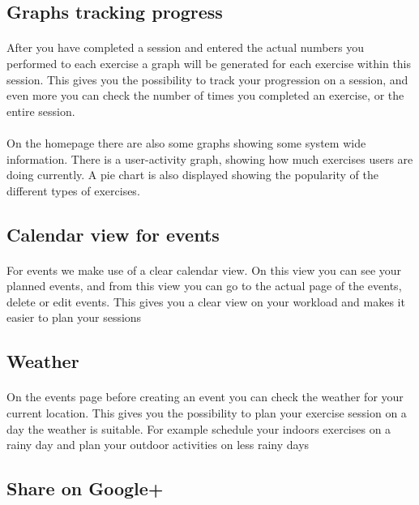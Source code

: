 \documentclass[11pt,a4paper]{scrartcl}
\begin{document}
\subsection{Graphs tracking progress}
\paragraph{}After you have completed a session and entered the actual numbers you performed to each exercise a graph will be generated for each exercise within this session. This gives you the possibility to track your progression on a session, and even more you can check the number of times you completed an exercise, or the entire session.
\paragraph{}On the homepage there are also some graphs showing some system wide information. There is a user-activity graph, showing how much exercises users are doing currently. A pie chart is also displayed showing the popularity of the different types of exercises.
\subsection{Calendar view for events}
\paragraph{}For events we make use of a clear calendar view. On this view you can see your planned events, and from this view you can go to the actual page of the events, delete or edit events. This gives you a clear view on your workload and makes it easier to plan your sessions

\subsection{Weather}
\paragraph{}On the events page before creating an event you can check the weather for your current location. This gives you the possibility to plan your exercise session on a day the weather is suitable. For example schedule your indoors exercises on a rainy day and plan your outdoor activities on less rainy days
\subsection{Share on Google+}
\end{document}
